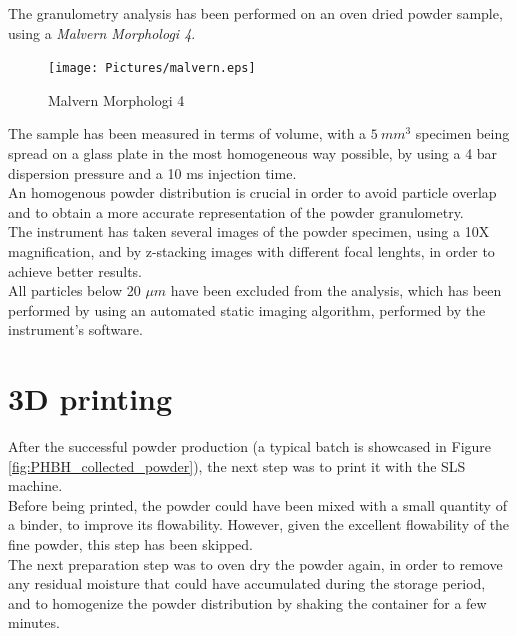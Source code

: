 \documentclass{article}
\begin{document}
        The granulometry analysis has been performed on an oven dried powder sample, 
        using a \textit{Malvern Morphologi 4}. \\ 

        \begin{figure}[ht]
            \centering
            \texttt{[image: Pictures/malvern.eps]}
            \caption{Malvern Morphologi 4}
            \label{fig:morphologi4}
        \end{figure}

        The sample has been measured in terms of volume, with a $5 \ mm^3$ specimen being spread on a glass plate in the 
        most homogeneous way possible, by using a 4 bar dispersion pressure and a 10 ms injection time. \\ 

        An homogenous powder distribution is crucial in order to avoid particle overlap and to obtain a more accurate 
        representation of the powder granulometry. \\ 

        The instrument has taken several images of the powder specimen, using a 10X magnification, and by z-stacking 
        images with different focal lenghts, in order to achieve better results. \\

        All particles below 20 $\mu m$ have been excluded from the analysis, which has been performed by using an automated 
        static imaging algorithm, performed by the instrument's software. \\ 

      \clearpage

      \section{3D printing\label{SLS_printing_experimental}}

      After the successful powder production (a typical batch is showcased in Figure \ref{fig:PHBH_collected_powder}), the next step was to print it with the SLS machine. \\
  
      Before being printed, the powder could have been mixed with a small quantity of a binder, to improve its flowability. 
      However, given the excellent flowability of the fine powder, this step has been skipped. \\
  
      The next preparation step was to oven dry the powder again, in order to remove any residual moisture
      that could have accumulated during the storage period, and to homogenize the powder distribution 
      by shaking the container for a few minutes. \\
  
\end{document}
